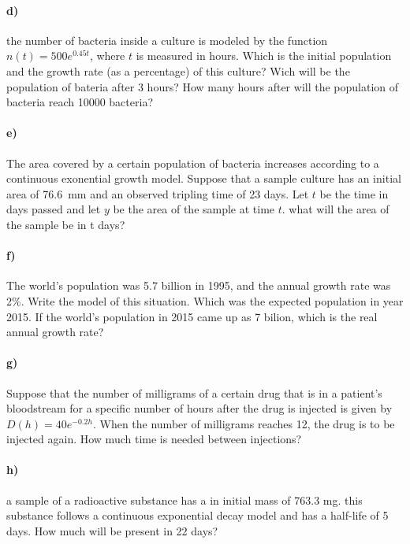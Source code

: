 \documentclass[../main.tex]{subfiles}
\begin{document}
\newpage

\paragraph{d)} the number of bacteria inside a culture is modeled by the function $n(t) = 500e^{0.45t}$, where $t$ is measured in hours.
Which is the initial population and the growth rate (as a percentage) of this culture?
Wich will be the population of bateria after 3 hours?
How many hours after will the population of bacteria reach \num{10000} bacteria?

\newpage 

\paragraph{e)} The area covered by a certain population of bacteria increases according to a continuous exonential growth model.
Suppose that a sample culture has an initial area of \SI{76.6}{\milli\meter} and an observed tripling time of 23 days.
Let $t$ be the time in days passed and let $y$ be the area of the sample at time $t$.
what will the area of the sample be in t days?

\newpage

\paragraph{f)} The world's population was 5.7 billion in 1995, and the annual growth rate was 2\%.
Write the model of this situation.
Which was the expected population in year 2015.
If the world's population in 2015 came up as 7 bilion, which is the real annual growth rate?

\newpage

\paragraph{g)} Suppose that the number of milligrams of a certain drug that is in a patient's bloodstream for a specific number of hours after the drug is injected is given by $D(h)=40e^{-0.2h}.$
When the number of milligrams reaches 12, the drug is to be injected again.
How much time is needed between injections?

\newpage


\paragraph{h)} a sample of a radioactive substance has a in initial mass of 763.3 mg.
this substance follows a continuous exponential decay model and has a half-life of 5 days.
How much will be present in 22 days?
\end{document}
